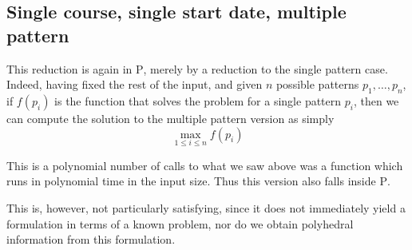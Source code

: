 \subsection{Single course, single start date, multiple pattern}

This reduction is again in \textsc{P}, merely by a reduction to the single pattern case. Indeed, having fixed the rest of the input, and given $n$ possible patterns $p_1, \dots, p_n$, if $f(p_i)$ is the function that solves the problem for a single pattern $p_i$, then we can compute the solution to the multiple pattern version as simply
$$
\max_{1 \le i \le n} f(p_i)
$$

This is a polynomial number of calls to what we saw above was a function which runs in polynomial time in the input size. Thus this version also falls inside \textsc{P}.

This is, however, not particularly satisfying, since it does not immediately yield a formulation in terms of a known problem, nor do we obtain polyhedral information from this formulation.
